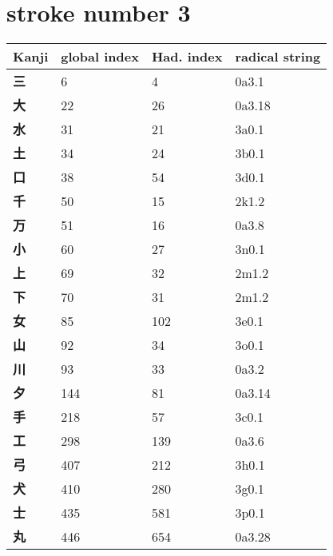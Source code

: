\section{stroke number 3}
  \begin{longtable}[c]{llll}
    \bfseries Kanji & \bfseries global index & \bfseries Had. index & \bfseries radical string\\\hline\endhead
    \bfseries 三 & 6 & 4 & 0a3.1\\
    \bfseries 大 & 22 & 26 & 0a3.18\\
    \bfseries 水 & 31 & 21 & 3a0.1\\
    \bfseries 土 & 34 & 24 & 3b0.1\\
    \bfseries 口 & 38 & 54 & 3d0.1\\
    \bfseries 千 & 50 & 15 & 2k1.2\\
    \bfseries 万 & 51 & 16 & 0a3.8\\
    \bfseries 小 & 60 & 27 & 3n0.1\\
    \bfseries 上 & 69 & 32 & 2m1.2\\
    \bfseries 下 & 70 & 31 & 2m1.2\\
    \bfseries 女 & 85 & 102 & 3e0.1\\
    \bfseries 山 & 92 & 34 & 3o0.1\\
    \bfseries 川 & 93 & 33 & 0a3.2\\
    \bfseries 夕 & 144 & 81 & 0a3.14\\
    \bfseries 手 & 218 & 57 & 3c0.1\\
    \bfseries 工 & 298 & 139 & 0a3.6\\
    \bfseries 弓 & 407 & 212 & 3h0.1\\
    \bfseries 犬 & 410 & 280 & 3g0.1\\
    \bfseries 士 & 435 & 581 & 3p0.1\\
    \bfseries 丸 & 446 & 654 & 0a3.28\\
  \end{longtable}
